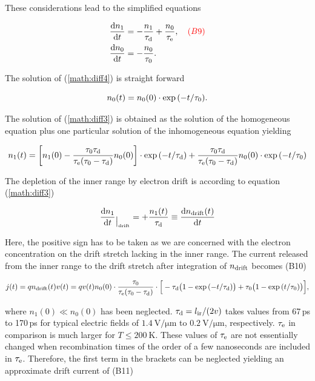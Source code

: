 These considerations lead to the simplified equations

\begin{align}
\label{math:diff3}
 \frac{\mathrm d n_1}{\mathrm d t} &= -\frac{n_1}{\tau_{\textrm{d}}}  + \frac{n_0}{\tau_\textrm{e}},\quad {\color{red}(B9)}\\
 \frac{\mathrm d n_0}{\mathrm d t} &= -\frac{n_0}{\tau_{0}}.
 \label{math:diff4}
\end{align}

\noindent
The solution of (\ref{math:diff4}) is straight forward

\begin{equation}
 n_0(t) = n_0(0)\cdot \exp{\left(-t/\tau_{0}\right)}. 
\end{equation}

\noindent
The solution of (\ref{math:diff3}) is obtained as the solution of the homogeneous equation plus one particular solution of the inhomogeneous equation yielding

\begin{equation}
 n_1(t) = \left[ n_1(0) - \frac{\tau_{0}\tau_{\textrm{d}}}{\tau_\textrm{e}(\tau_{0}-\tau_{\textrm{d}})} n_0(0)\right]\cdot \exp{\left(-t/\tau_{\textrm{d}}\right)} 
                        + \frac{\tau_{0}\tau_{\textrm{d}}}{\tau_\textrm{e}(\tau_{0}-\tau_{\textrm{d}})} n_0(0) \cdot \exp{\left(-t/\tau_{0}\right)}
  \label{math:sol1}
\end{equation}

\noindent
The depletion of the inner range by electron drift is according to equation (\ref{math:diff3})

\begin{equation}
 \frac{\mathrm d n_1}{\mathrm d t}{}_{\big|_{{\textrm{drift}}}} = + \frac{n_1(t)}{\tau_{\textrm{d}}} \equiv \frac{\mathrm d n_{{\textrm{drift}}} (t)}{\mathrm d t}
\end{equation}

Here, the positive sign has to be taken as we are concerned with the electron concentration on the drift stretch lacking in the inner range.
The current released from the inner range to the drift stretch after integration of $n_{{\textrm{drift}}}$ becomes {\color{red}(B10)}

\begin{equation}
 j(t) = \mathnormal{q} n_{{\textrm{drift}}}(t) v(t) = \mathnormal{q} v(t) n_0(0) \cdot \frac{\tau_{0}}{\tau_\textrm{e}(\tau_{0}-\tau_{\textrm{d}})} \cdot \Big[ -\tau_{\textrm{d}}\big( 1- \exp{(-t/\tau_{\textrm{d}})}\big) + \tau_{0}\big( 1 - \exp{(t/\tau_{0})} \big) \Big],
\end{equation}

\noindent
where $n_1(0) \ll n_0(0)$ has been neglected. 
$\tau_{\textrm{d}} = l_{\textrm{ir}}/(2v)$ takes values from 67\,ps to 170\,ps for typical electric fields of $\SI{1.4}{\volt/\um}$ to $\SI{0.2}{\volt/\um}$, respectively. 
$\tau_\textrm{e}$ in comparison is much larger for $T \leq \SI{200}{\kelvin}$. 
These values of $\tau_\textrm{e}$ are not essentially changed when recombination times of the order of a few nanoseconds are included in $\tau_\textrm{e}$. 
Therefore, the first term in the brackets can be neglected yielding an approximate drift current of {\color{red}(B11)}

